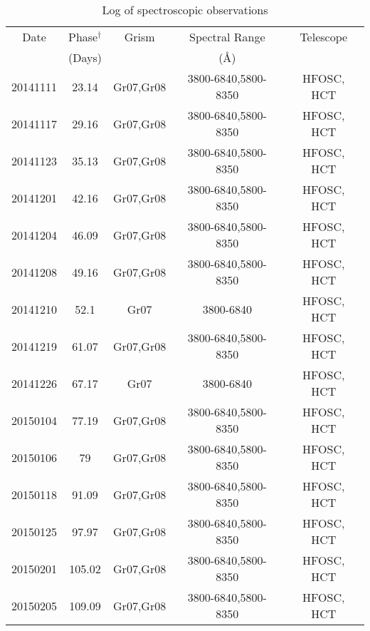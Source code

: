\begin{table*}
\caption{Log of spectroscopic observations}
\centering
\smallskip
\begin{tabular}{c c c c c}
\hline \hline
Date          & Phase$^\dagger$          & Grism      & Spectral Range        & Telescope       \\
              &(Days)                    &            & (\AA)                 &                 \\
\hline
20141111      & 23.14                    & Gr07,Gr08       & 3800-6840,5800-8350       & HFOSC, HCT  \\
20141117      & 29.16                    & Gr07,Gr08       & 3800-6840,5800-8350       & HFOSC, HCT  \\
20141123      & 35.13                    & Gr07,Gr08       & 3800-6840,5800-8350       & HFOSC, HCT  \\
20141201      & 42.16                    & Gr07,Gr08 	  & 3800-6840,5800-8350       & HFOSC, HCT  \\
20141204      & 46.09                    & Gr07,Gr08       & 3800-6840,5800-8350       & HFOSC, HCT  \\
20141208      & 49.16                    & Gr07,Gr08       & 3800-6840,5800-8350       & HFOSC, HCT  \\
20141210      & 52.1                     & Gr07            & 3800-6840                 & HFOSC, HCT   \\
20141219      & 61.07                    & Gr07,Gr08       & 3800-6840,5800-8350       & HFOSC, HCT    \\
20141226      & 67.17                    & Gr07            & 3800-6840                 & HFOSC, HCT   \\
20150104      & 77.19                    & Gr07,Gr08       & 3800-6840,5800-8350       & HFOSC, HCT    \\
20150106      & 79                       & Gr07,Gr08       & 3800-6840,5800-8350       & HFOSC, HCT     \\
20150118      & 91.09                    & Gr07,Gr08       & 3800-6840,5800-8350       & HFOSC, HCT     \\
20150125      & 97.97                    & Gr07,Gr08       & 3800-6840,5800-8350       & HFOSC, HCT     \\
20150201      & 105.02                   & Gr07,Gr08       & 3800-6840,5800-8350       & HFOSC, HCT     \\
20150205      & 109.09                   & Gr07,Gr08       & 3800-6840,5800-8350       & HFOSC, HCT     \\

\end{tabular}
\end{table*}
